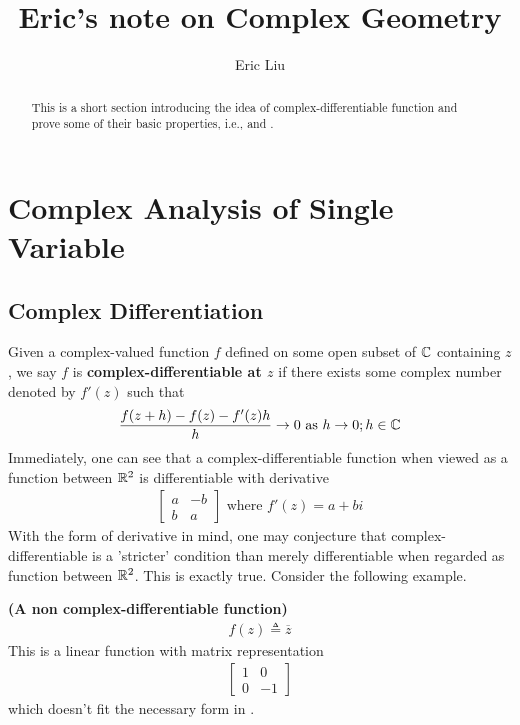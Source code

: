 \documentclass{report}
\title{Eric's note on Complex Geometry}
\author{Eric Liu}
\date{}
\begin{document}
\maketitle
\newpage%

\tableofcontents
\pagebreak
\chapter{Complex Analysis of Single Variable}
\section{Complex Differentiation}
\begin{abstract}
This is a short section introducing the idea of complex-differentiable function and prove some of their basic properties, i.e.,  and . 
\end{abstract}
\begin{mdframed}
Given a complex-valued function $f$ defined on some open subset of  $\mathbb{C}$ containing  $z$, we say  $f$ is \textbf{complex-differentiable at $z$} if there exists some complex number denoted by $f'(z)$ such that 
\begin{align*}
\frac{f(z+h)-f(z)-f'(z)h}{h}\to 0\text{ as }h\to 0;h\in\mathbb{C}
\end{align*}
Immediately, one can see that a complex-differentiable function when viewed as a function between $\mathbb{R}^2$ is differentiable with derivative 
\begin{align}
\label{cd}
  \begin{bmatrix}
    a & -b \\
    b & a
  \end{bmatrix}\text{ where }f'(z)=a+b i
\end{align}
With the form of derivative in mind, one may conjecture that complex-differentiable is a 'stricter' condition than merely differentiable when regarded as function between $\mathbb{R}^2$. This is exactly true. Consider the following example.
\end{mdframed}
\begin{Example}{\textbf{(A non complex-differentiable function)}}{}
\begin{align*}
f(z)\triangleq \overline{z}
\end{align*}
This is a linear function with matrix representation 
\begin{align*}
\begin{bmatrix}
  1&0 \\
  0& -1
\end{bmatrix}
\end{align*}
which doesn't fit the necessary form in .
\end{Example}
\end{document}
